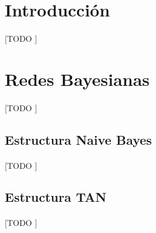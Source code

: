 \documentclass{article}
\begin{document}
	\maketitle %

	\thispagestyle{fancy} %



	\begin{abstract}
		\noindent [TODO ]
	\end{abstract}

	\section{Introducción}
	\label{sec:intro}

		\paragraph{}
		[TODO ]


	\section{Redes Bayesianas}
	\label{sec:bayes_network}

		\paragraph{}
		[TODO ]

		\subsection{Estructura Naive Bayes}
		\label{sec:structure_naive}

			\paragraph{}
			[TODO ]


		\subsection{Estructura TAN}
		\label{sec:structure_tan}

			\paragraph{}
			[TODO ]
\end{document}
